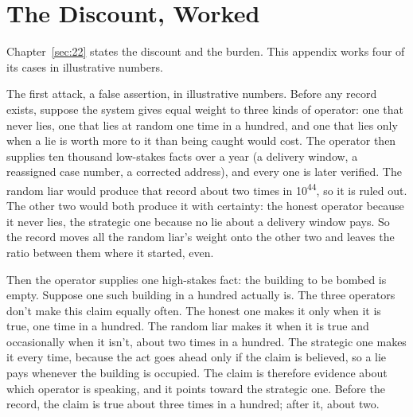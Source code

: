\chapter{The Discount, Worked}
\label{sec:E}
Chapter~\ref{sec:22} states the discount and the burden. This appendix works four of its cases in illustrative numbers.


The first attack, a false assertion, in illustrative numbers. Before any record exists, suppose the system gives equal weight to three kinds of operator: one that never lies, one that lies at random one time in a hundred, and one that lies only when a lie is worth more to it than being caught would cost. The operator then supplies ten thousand low-stakes facts over a year (a delivery window, a reassigned case number, a corrected address), and every one is later verified. The random liar would produce that record about two times in 10\textsuperscript{44}, so it is ruled out. The other two would both produce it with certainty: the honest operator because it never lies, the strategic one because no lie about a delivery window pays. So the record moves all the random liar's weight onto the other two and leaves the ratio between them where it started, even.

Then the operator supplies one high-stakes fact: the building to be bombed is empty. Suppose one such building in a hundred actually is. The three operators don't make this claim equally often. The honest one makes it only when it is true, one time in a hundred. The random liar makes it when it is true and occasionally when it isn't, about two times in a hundred. The strategic one makes it every time, because the act goes ahead only if the claim is believed, so a lie pays whenever the building is occupied. The claim is therefore evidence about which operator is speaking, and it points toward the strategic one. Before the record, the claim is true about three times in a hundred; after it, about two.


